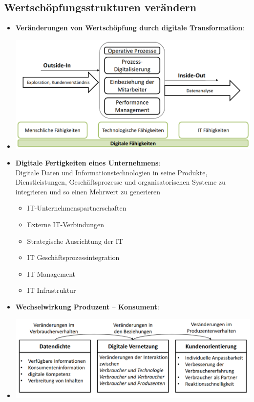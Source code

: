 \documentclass[12pt,a4paper]{article}
\begin{document}
\subsection{Wertschöpfungsstrukturen verändern} %
\begin{itemize}
   \item \textbf{Veränderungen von Wertschöpfung durch digitale Transformation}:
   \item[] \includegraphics[scale=0.40]{veraenderung.png}
   
   \item \textbf{Digitale Fertigkeiten eines Unternehmens}:\\
         Digitale Daten und Informationstechnologien in seine Produkte, Dienstleistungen, Geschäftsprozesse und organisatorischen Systeme zu integrieren und so einen Mehrwert zu generieren
		\begin{itemize}
			\item IT-Unternehmenspartnerschaften
			\item Externe IT-Verbindungen
			\item Strategische Ausrichtung der IT
			\item IT Geschäftsprozessintegration
			\item IT Management
			\item IT Infrastruktur
		\end{itemize}

   \item \textbf{Wechselwirkung Produzent $–$ Konsument}:
   \item[] \includegraphics[scale=0.33]{prozess.png}
   

\end{itemize}
\end{document}
